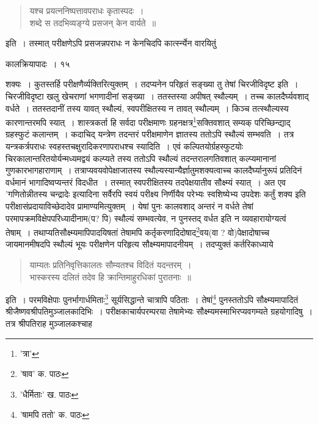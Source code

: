 \documentclass[11pt, openany]{book}
\begin{document}
{\begin{quote}
{\qt यश्च प्रयत्ननिष्पत्तावपराधः कृतास्पदः~।\\
शब्दे स तदभिव्यङ्ग्ये प्रसजन् केन वार्यते~॥}
\end{quote}

\noindent इति~। तस्मात् परीक्षणेऽपि प्रसजन्नपराधः न केनचिदपि कार्त्स्न्येन वारयितुं

\newpage

\vspace{3cm} \hspace{4cm}कालक्रियापादः~। \hspace{4cm}१५ 

\vspace{0.3cm}
\noindent शक्यः~। कुतस्तर्हि परीक्षणैर्व्यक्तिरित्युक्तम्~। तदप्यनेन परिहृतं {\qt सङ्ख्या तु तेषां चिरजीविदृष्ट} इति~। चिरजीविदृष्टा खलु खेचराणां भगणादीनां सङ्ख्या~। ततस्तस्या अपीषत् स्थौल्यम्~। तच्च कालदैर्घ्यवशाद् वर्धते~। ततस्तदानीं तस्य यावत् स्थौल्यं, स्वपरीक्षितस्य न तावत् स्थौल्यम्~। किञ्च तत्स्थौल्यस्य कारणान्तरमपि स्यात्~। शास्त्रकर्ता हि सर्वदा परीक्षमाणः ग्रहनक्षत्र\renewcommand{\thefootnote}{१}\footnote{'त्रा'}सक्तिवशात् सम्यक् परिच्छिन्द्याद् ग्रहस्फुटं कलान्तम्~। कदाचिद् यन्त्रेण तदन्तरं परीक्षमाणेन ज्ञातस्य ततोऽपि स्थौल्यं सम्भवति~। तत्र यन्त्रकर्त्रपराधः स्वहस्तचक्षुरादिकरणापराधश्च स्यादिति~। एवं कल्पितयोर्ग्रहस्फुटयोः चिरकालान्तरितयोर्यन्मध्यमद्वयं कल्प्यते तस्य ततोऽपि स्थौल्यं तदन्तरालगतिवशात् कल्प्यमानानां गुणकारभागहाराणाम्~। तत्राप्यवयवोपेक्षाजातस्य स्थौल्यस्यान्यैर्ज्ञातुमशक्यत्वाच्च कालदैर्घ्यानुरूपं प्रतिदिनं वर्धमानं भागादिष्वप्यन्तरं विदधीत~। तस्मात् स्वपरीक्षितस्य तदपेक्षयातीव सौक्ष्म्यं स्यात्~। अत एव '{\qt गणितोन्नीतस्य चन्द्रादेः} इत्यादिना सर्वैरपि स्वयं परीक्ष्य
निर्णीयैव परेभ्यः स्वशिष्येभ्य उपदेशः कर्तुं शक्य इति परीक्षासंप्रदायाविच्छेदादेव प्रामाण्यमित्युक्तम्~। येषां पुनः कालवशाद् अन्तरं न वर्धते तेषां
परमापक्रमविक्षेपपरिध्यादीनाम(प? पि) स्थौल्यं सम्भवत्येव, न पुनस्तद् वर्धत इति न व्यवहारायोग्यत्वं तेषाम्~। तथाप्यतिसौक्ष्म्यमापिपादयिषतां तेषामपि कर्तृकरणादिदोषाद\renewcommand{\thefootnote}{२}\footnote{'षाव' क. पाठः}वय(वा ? वो)पेक्षादोषाच्च जायमानमीषदपि स्थौल्यं भूयः परीक्षणेन परिहृत्य सौक्ष्म्यमापादनीयम्~। तदप्युक्तं कर्तरिकाध्याये\textendash

\begin{quote}
{\qt याम्यतः प्रतिनिवृत्तिकालतः सौम्यतश्च विदितं यदन्तरम्~।\\
भास्करस्य दलितं तदेव हि क्रान्तिमाहुरधिकां पुरातनाः~॥}
\end{quote}

\noindent इति~। परमविक्षेपाः पुनर्भागार्धमिताः\renewcommand{\thefootnote}{३}\footnote{'धैर्मिताः' ख. पाठः} सूर्यसिद्धान्ते चात्रापि पठिताः~। तेषां\renewcommand{\thefootnote}{४}\footnote{'षामपि ततो' क. पाठः} पुनस्ततोऽपि सौक्ष्म्यमापादितं श्रीजैष्णवश्रीपतिमुञ्जालकादिभिः~। परीक्षकाचार्यपरम्परया तेषामेभ्यः सौक्ष्म्यमस्माभिरप्यवगम्यते ग्रहयोगादिषु~। तत्र श्रीपतिराह मुञ्जालकश्चाह\textendash

}
\end{document}
